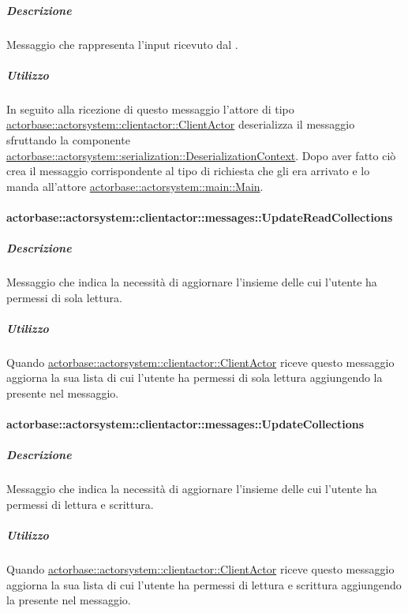 \documentclass{scalatekids-article}
\begin{document}
\subparagraph{Descrizione}

Messaggio che rappresenta l'input ricevuto dal .

\subparagraph{Utilizzo}

In seguito alla ricezione di questo messaggio l'attore di tipo
\hyperref[sec:actorbase::actorsystem::clientactor::ClientActor]{actorbase::actorsystem::clientactor::ClientActor}
deserializza il messaggio sfruttando la componente
\hyperref[sec:actorbase::actorsystem::serialization::DeserializationContext]{actorbase::actorsystem::serialization::DeserializationContext}.
Dopo aver fatto ciò crea il messaggio corrispondente al tipo di richiesta che gli era arrivato
e lo manda all'attore \hyperref[sec:actorbase::actorsystem::main::Main]{actorbase::actorsystem::main::Main}.

\paragraph{actorbase::actorsystem::clientactor::messages::UpdateReadCollections}
\label{sec:actorbase::actorsystem::clientactor::messages::UpdateReadCollections}

\subparagraph{Descrizione}

Messaggio che indica la necessità di aggiornare l'insieme delle
 cui l'utente ha permessi di sola lettura.

\subparagraph{Utilizzo}

Quando \hyperref[sec:actorbase::actorsystem::clientactor::ClientActor]{actorbase::actorsystem::clientactor::ClientActor}
riceve questo messaggio aggiorna la sua lista di 
cui l'utente ha permessi di sola lettura aggiungendo la
 presente nel messaggio.

\paragraph{actorbase::actorsystem::clientactor::messages::UpdateCollections}
\label{sec:actorbase::actorsystem::clientactor::messages::UpdateCollections}

\subparagraph{Descrizione}

Messaggio che indica la necessità di aggiornare l'insieme delle
 cui l'utente ha permessi di lettura e scrittura.

\subparagraph{Utilizzo}

Quando \hyperref[sec:actorbase::actorsystem::clientactor::ClientActor]{actorbase::actorsystem::clientactor::ClientActor}
riceve questo messaggio aggiorna la sua lista di 
cui l'utente ha permessi di lettura e scrittura aggiungendo
la  presente nel messaggio.
\end{document}
